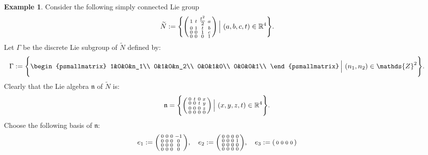 \documentclass[preprint,12pt,1p]{elsarticle}
\theoremstyle{plain}
\theoremstyle{definition}
\newtheorem{example}[theorem]{Example}
\newcommand{\rel}{\mathbb{R}}
\newcommand{\intg}{\mathds{Z}}
\numberwithin{equation}{section}
\newcommand{\nl}{\mathfrak{n}}
\begin{document}
\begin{example}\label{rriF2}
Consider the following simply connected Lie group
\begin{equation*}
\widetilde{N}:=\Bigg\{\begin{psmallmatrix}
1&t&\tfrac{t^2}{2}&a\\
0&1&t&b\\
0&0&1&c\\
0&0&0&1\\
\end{psmallmatrix}\,\Big|\,\,(a,b,c,t)\in\rel^4\Bigg\}.
\end{equation*}
Let $\Gamma$ be the discrete Lie subgroup of $\widetilde{N}$ defined by: 
\begin{equation*}
\Gamma:=\Bigg\{\begin{psmallmatrix}
1&0&0&n_1\\
0&1&0&n_2\\
0&0&1&0\\
0&0&0&1\\
\end{psmallmatrix}\,\Big|\,\,(n_1,n_2)\in\intg^2\Bigg\}.
\end{equation*}
Clearly that the Lie algebra $\nl$ of $\widetilde{N}$ is:
\begin{equation*}
\nl=\Bigg\{\begin{psmallmatrix}
0&t&0&x\\
0&0&t&y\\
0&0&0&z\\
0&0&0&0\\
\end{psmallmatrix}\,\Big|\,\,(x,y,z,t)\in\rel^4\Bigg\}.
\end{equation*}
Choose the following basis of $\nl$:
\begin{equation*}
e_1:=\begin{psmallmatrix}
0&0&0&-1\\
0&0&0&0\\
0&0&0&0\\
0&0&0&0\\
\end{psmallmatrix},\quad e_2:=\begin{psmallmatrix}
0&0&0&0\\
0&0&0&1\\
0&0&0&0\\
0&0&0&0\\
\end{psmallmatrix},\quad e_3:=\begin{psmallmatrix}
0&0&0&0\\

\end{psmallmatrix}
\end{equation*}
\end{example}
\end{document}
